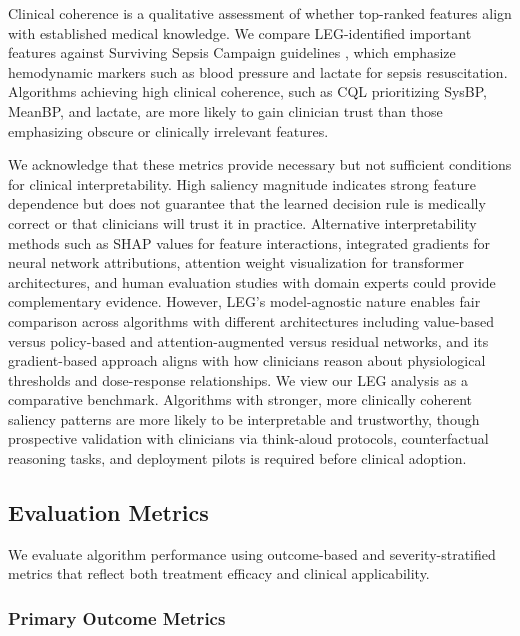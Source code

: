 Clinical coherence is a qualitative assessment of whether top-ranked features align with established medical knowledge. We compare LEG-identified important features against Surviving Sepsis Campaign guidelines \citep{rhodes2017ssc}, which emphasize hemodynamic markers such as blood pressure and lactate for sepsis resuscitation. Algorithms achieving high clinical coherence, such as CQL prioritizing SysBP, MeanBP, and lactate, are more likely to gain clinician trust than those emphasizing obscure or clinically irrelevant features.

We acknowledge that these metrics provide necessary but not sufficient conditions for clinical interpretability. High saliency magnitude indicates strong feature dependence but does not guarantee that the learned decision rule is medically correct or that clinicians will trust it in practice. Alternative interpretability methods such as SHAP values for feature interactions, integrated gradients for neural network attributions, attention weight visualization for transformer architectures, and human evaluation studies with domain experts could provide complementary evidence. However, LEG's model-agnostic nature enables fair comparison across algorithms with different architectures including value-based versus policy-based and attention-augmented versus residual networks, and its gradient-based approach aligns with how clinicians reason about physiological thresholds and dose-response relationships. We view our LEG analysis as a comparative benchmark. Algorithms with stronger, more clinically coherent saliency patterns are more likely to be interpretable and trustworthy, though prospective validation with clinicians via think-aloud protocols, counterfactual reasoning tasks, and deployment pilots is required before clinical adoption.

\subsection{Evaluation Metrics}\label{sec:methods:eval}

We evaluate algorithm performance using outcome-based and severity-stratified metrics that reflect both treatment efficacy and clinical applicability.

\subsubsection{Primary Outcome Metrics}

